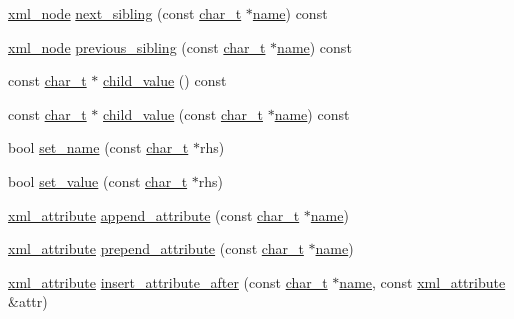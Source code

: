 \begin{DoxyCompactItemize}
\item 
\hyperlink{classpugi_1_1xml__node}{xml\-\_\-node} \hyperlink{classpugi_1_1xml__node_a51a25d1e6f2315b65a1f969126cbc612}{next\-\_\-sibling} (const \hyperlink{namespacepugi_aef5a7a62cba0507542220ea15afe39df}{char\-\_\-t} $\ast$\hyperlink{classpugi_1_1xml__node_ac765caace42ecf252d90aea81e09df57}{name}) const 
\item 
\hyperlink{classpugi_1_1xml__node}{xml\-\_\-node} \hyperlink{classpugi_1_1xml__node_a311405d1ee4a564071a5f44b476b05f7}{previous\-\_\-sibling} (const \hyperlink{namespacepugi_aef5a7a62cba0507542220ea15afe39df}{char\-\_\-t} $\ast$\hyperlink{classpugi_1_1xml__node_ac765caace42ecf252d90aea81e09df57}{name}) const 
\item 
const \hyperlink{namespacepugi_aef5a7a62cba0507542220ea15afe39df}{char\-\_\-t} $\ast$ \hyperlink{classpugi_1_1xml__node_a1c824a58d4c591c0da8f5dc39938456f}{child\-\_\-value} () const 
\item 
const \hyperlink{namespacepugi_aef5a7a62cba0507542220ea15afe39df}{char\-\_\-t} $\ast$ \hyperlink{classpugi_1_1xml__node_ad091dcc0ff970fb2920b8b2942154c94}{child\-\_\-value} (const \hyperlink{namespacepugi_aef5a7a62cba0507542220ea15afe39df}{char\-\_\-t} $\ast$\hyperlink{classpugi_1_1xml__node_ac765caace42ecf252d90aea81e09df57}{name}) const 
\item 
bool \hyperlink{classpugi_1_1xml__node_a9d688489fcf0960e945a12480419e434}{set\-\_\-name} (const \hyperlink{namespacepugi_aef5a7a62cba0507542220ea15afe39df}{char\-\_\-t} $\ast$rhs)
\item 
bool \hyperlink{classpugi_1_1xml__node_a160f1fa7a0eda1e5ad9d19d45f6b0e4e}{set\-\_\-value} (const \hyperlink{namespacepugi_aef5a7a62cba0507542220ea15afe39df}{char\-\_\-t} $\ast$rhs)
\item 
\hyperlink{classpugi_1_1xml__attribute}{xml\-\_\-attribute} \hyperlink{classpugi_1_1xml__node_a417eb03f034b432bb2800e54e38022aa}{append\-\_\-attribute} (const \hyperlink{namespacepugi_aef5a7a62cba0507542220ea15afe39df}{char\-\_\-t} $\ast$\hyperlink{classpugi_1_1xml__node_ac765caace42ecf252d90aea81e09df57}{name})
\item 
\hyperlink{classpugi_1_1xml__attribute}{xml\-\_\-attribute} \hyperlink{classpugi_1_1xml__node_a7d70631d6cb3624cdfc4cf9ef4abad06}{prepend\-\_\-attribute} (const \hyperlink{namespacepugi_aef5a7a62cba0507542220ea15afe39df}{char\-\_\-t} $\ast$\hyperlink{classpugi_1_1xml__node_ac765caace42ecf252d90aea81e09df57}{name})
\item 
\hyperlink{classpugi_1_1xml__attribute}{xml\-\_\-attribute} \hyperlink{classpugi_1_1xml__node_a74ab20fa84dffde317f8899af628f041}{insert\-\_\-attribute\-\_\-after} (const \hyperlink{namespacepugi_aef5a7a62cba0507542220ea15afe39df}{char\-\_\-t} $\ast$\hyperlink{classpugi_1_1xml__node_ac765caace42ecf252d90aea81e09df57}{name}, const \hyperlink{classpugi_1_1xml__attribute}{xml\-\_\-attribute} \&attr)

\end{DoxyCompactItemize}
